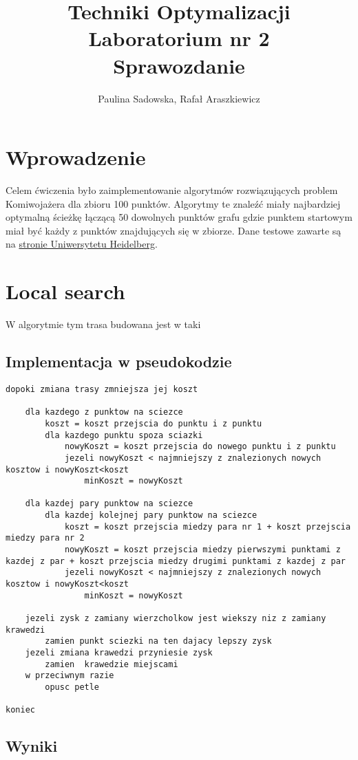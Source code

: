 \documentclass[a4paper 10pt]{article}
\title{\textbf{Techniki Optymalizacji} \\
Laboratorium nr 2 \\
Sprawozdanie}
\author{Paulina Sadowska, Rafał Araszkiewicz}
\begin{document}
\maketitle

\section{Wprowadzenie}
Celem ćwiczenia było zaimplementowanie algorytmów rozwiązujących problem Komiwojażera dla zbioru 100 punktów. Algorytmy te znaleźć miały najbardziej optymalną ścieżkę łączącą 50 dowolnych punktów grafu gdzie punktem startowym miał być każdy z punktów znajdujących się w zbiorze. Dane testowe zawarte są na \hyperref[http://comopt.ifi.uni-heidelberg.de/software/TSPLIB95/XML-TSPLIB/instances/kroA100.xml.zip]{stronie Uniwersytetu Heidelberg}. 
\section{Local search}
\label{Local search}
W algorytmie tym trasa budowana jest w taki 
\subsection{Implementacja w pseudokodzie}
\begin{lstlisting}[frame=single]
dopoki zmiana trasy zmniejsza jej koszt

	dla kazdego z punktow na sciezce
		koszt = koszt przejscia do punktu i z punktu
		dla kazdego punktu spoza sciazki
			nowyKoszt = koszt przejscia do nowego punktu i z punktu
			jezeli nowyKoszt < najmniejszy z znalezionych nowych kosztow i nowyKoszt<koszt
				minKoszt = nowyKoszt
				
	dla kazdej pary punktow na sciezce
		dla kazdej kolejnej pary punktow na sciezce
			koszt = koszt przejscia miedzy para nr 1 + koszt przejscia miedzy para nr 2
			nowyKoszt = koszt przejscia miedzy pierwszymi punktami z kazdej z par + koszt przejscia miedzy drugimi punktami z kazdej z par
			jezeli nowyKoszt < najmniejszy z znalezionych nowych kosztow i nowyKoszt<koszt
				minKoszt = nowyKoszt			
	
	jezeli zysk z zamiany wierzcholkow jest wiekszy niz z zamiany krawedzi
		zamien punkt sciezki na ten dajacy lepszy zysk
	jezeli zmiana krawedzi przyniesie zysk	
		zamien  krawedzie miejscami
	w przeciwnym razie
		opusc petle
	
koniec

\end{lstlisting}
\label{Local search code}
\subsection{Wyniki}

\end{document}
